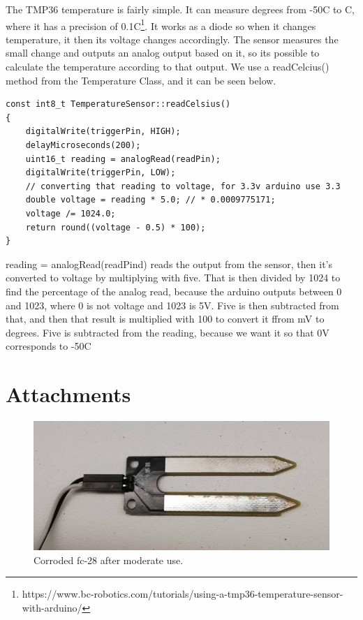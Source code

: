 \documentclass{article}
\begin{document}
The TMP36 temperature is fairly simple. It can measure degrees from -50\textdegree{}C to C, where it has a precision of 0.1\textdegree{}C\footnote{https://www.bc-robotics.com/tutorials/using-a-tmp36-temperature-sensor-with-arduino/}. It works as a diode so when it changes temperature, it then its voltage changes accordingly. The sensor measures the small change and outputs an analog output based on it, so its possible to calculate the temperature according to that output. We use a readCelcius() method from the Temperature Class, and it can be seen below.
\pagebreak
\begin{lstlisting}[language=Arduino]
const int8_t TemperatureSensor::readCelsius()
{
    digitalWrite(triggerPin, HIGH);
    delayMicroseconds(200);
    uint16_t reading = analogRead(readPin);
    digitalWrite(triggerPin, LOW);
    // converting that reading to voltage, for 3.3v arduino use 3.3
    double voltage = reading * 5.0; // * 0.0009775171;
    voltage /= 1024.0;
    return round((voltage - 0.5) * 100);
}

\end{lstlisting}

reading = analogRead(readPind) reads the output from the sensor, then it's converted to voltage by multiplying with five. That is then divided by 1024 to find the percentage of the analog read, because the arduino outputs between 0 and 1023, where 0 is not voltage and 1023 is 5V. Five is then subtracted from that, and then that result is multiplied with 100 to convert it ffrom mV to degrees. Five is subtracted from the reading, because we want it so that 0V corresponds to -50\textdegree{}C
\pagebreak

\section{Attachments}
\begin{figure}
  \centering
      \includegraphics{fc-28-corrosion}
  \caption{Corroded fc-28 after moderate use.}
\end{figure}


\pagebreak
{}

\nocite{*}
% 
\end{document}
